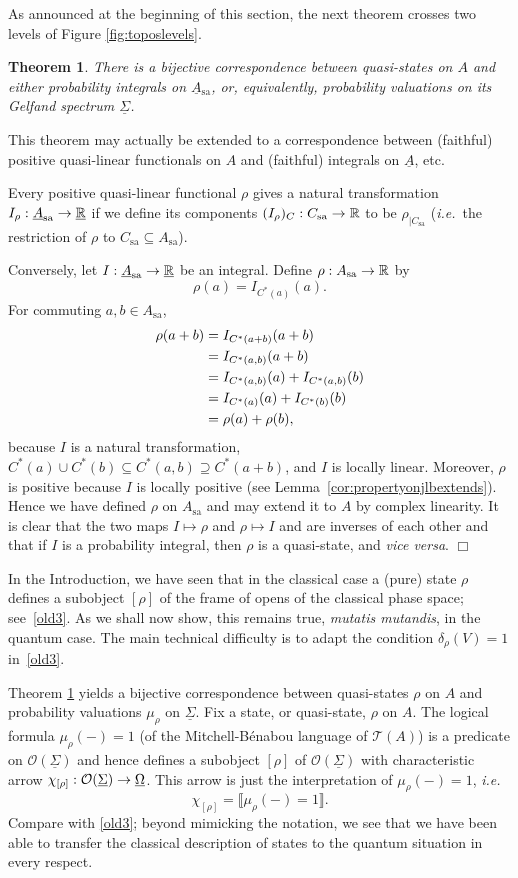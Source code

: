 \documentclass[12pt]{article}
\newcommand{\beq}{\begin{equation}}
\newcommand{\eeq}{\end{equation}}
\newcommand{\raw}{\rightarrow} \newcommand{\rat}{\mapsto}
\newcommand{\er}{\eqref}
\newcommand{\dl}{\delta} \newcommand{\Dl}{\Delta}
\newcommand{\rh}{\rho} \newcommand{\sg}{\sigma}
\newcommand{\ch}{\chi} \newcommand{\ps}{\psi} \newcommand{\Ps}{\Psi}
\newcommand{\CO}{{\mathcal O}} \newcommand{\CP}{{\mathcal P}}
\newcommand{\alg}[1]{\ensuremath{#1}}
\newcommand{\functor}[1]{\ensuremath{\underline{#1}}}
\newcommand{\asstopos}{\ensuremath{\mathcal{T}}}
\newcommand{\interpretation}[1]{\ensuremath{\llbracket{#1}\rrbracket}}
\newcommand{\sa}{\ensuremath{_{\mathrm{sa}}}}
\newcommand{\uA}{\underline{A}}
\newcommand{\TA}{\mathcal{T}(A)}
\newcommand{\ie}{\textit{i.e.}}
\newcommand{\ulS}{\functor{\Sigma}}
\renewcommand{\TA}{\asstopos(\alg{A})}
\newtheorem{theorem}{Theorem}
\newenvironment{proof}[1][Proof]%
{ \begin{trivlist}%
  \item[\hskip \labelsep {\bfseries #1}]%
}%
{ \end{trivlist}%
}
\newcommand{\qed}{\nobreak\hfill$\Box$}
\begin{document}
As announced at the beginning of this section,  the next theorem crosses two
levels of Figure \ref{fig:toposlevels}.
\begin{theorem}
\label{thm:statesareintegrals}
  There is a bijective correspondence between quasi-states
  on $\alg{A}$ and either probability integrals on $\functor{\alg{A}}\sa$, or,
  equivalently, probability valuations on its Gelfand spectrum $\ulS$.
\end{theorem}
This theorem may actually be extended to a correspondence between
(faithful) positive quasi-linear functionals on $A$ and (faithful)
integrals on $\functor{\alg{A}}$, etc.
\begin{proof}
  Every positive quasi-linear functional $\rh$ gives a natural transformation
  $I_{\rh}:\uA\sa\raw\underline\R$ if we define its components
   $(I_{\rh})_C:C\sa\raw\R$ to be $\rh_{|C\sa}$ (\ie\ the restriction of $\rh$
to $C\sa\subseteq A\sa$).

Conversely, let $I:\functor{\alg{A}}\sa \raw\underline\R$
   be an integral. Define $\rho:A\sa \to \R$
  by
  \[ \rho(a) = I_{C^*(a)}(a). \]
   For commuting $a,b \in A\sa$,
\begin{align*}
   \rho(a+b)
    & = I_{C^*(a+b)}(a+b)\nonumber \\
    & = I_{C^*(a,b)}(a+b) \nonumber \\
    & =  I_{C^*(a,b)}(a) + I_{C^*(a,b)}(b)\nonumber \\
    & = I_{C^*(a)}(a) + I_{C^*(b)}(b) \nonumber \\
    & = \rho(a) + \rho(b),
\end{align*}
  because $I$ is a natural transformation, $C^*(a) \cup C^*(b)
  \subseteq C^*(a,b) \supseteq C^*(a+b)$, and $I$ is
  locally linear.  Moreover, $\rho$ is
  positive because $I$ is locally positive (see
  Lemma~\ref{cor:propertyonjlbextends}). Hence we have defined $\rh$
  on $A\sa$ and may extend it to $A$ by complex linearity. It is clear
  that the two maps $I\mapsto \rh$ and $\rh\mapsto I$ and are inverses
  of each other and that if $I$ is a probability integral, then $\rh$
  is a quasi-state, and {\it vice versa}.
  \qed
\end{proof}
In the Introduction, we have seen that in the classical case a (pure)
state $\rh$ defines a subobject $[\rho]$ of the frame of opens of the
classical phase space; see~\er{old3}. As we shall now show, this
remains true, {\it mutatis mutandis}, in the quantum case. The main
technical difficulty is to adapt the condition $\dl_{\rho}(V)=1$
in~\er{old3}.

Theorem \ref{thm:statesareintegrals} yields a bijective correspondence
between quasi-states $\rh$ on $A$ and probability valuations $
\mu_{\rh}$ on $\ulS$. Fix a state, or quasi-state, $\rh$ on $A$.  The
logical formula $\mu_{\rho}(-)=1$ (of the Mitchell-B{\'e}nabou
language of $\TA$) is a predicate on $\CO(\ulS)$ and hence defines a
subobject $[\rh]$ of $\CO(\ulS)$ with  characteristic arrow
$\ch_{[\rh]}:\CO(\ulS)\raw\underline{\Om}$. This arrow is just the
interpretation of $\mu_{\rho}(-)=1$, \ie\
\beq
  \ch_{[\rh]}= \interpretation{\mu_{\rho}(-)=1}.\label{rhoint}
\eeq
Compare with \er{old3}; beyond mimicking the notation, we see that we
have been able to transfer the classical description of states to the
quantum situation in every respect.
\end{document}
